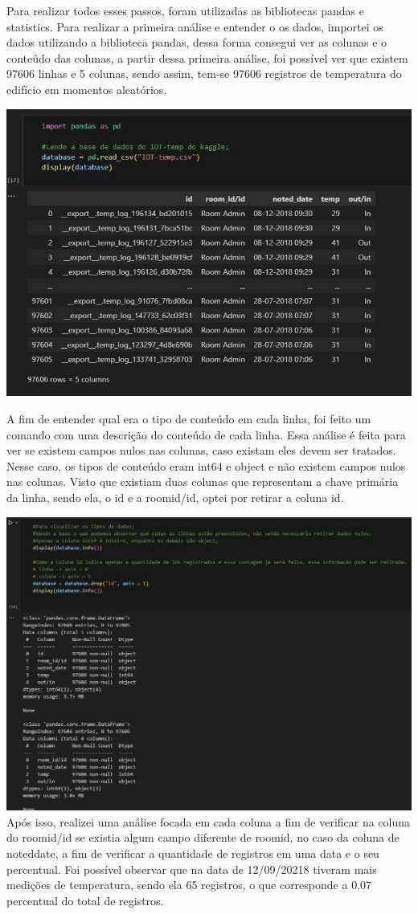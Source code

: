 \documentclass[a4paper, 12pt]{article}
\begin{document}
Para realizar todos esses passos, foram utilizadas as bibliotecas pandas e statistics. Para realizar a primeira análise e entender o os dados, importei os dados utilizando a biblioteca pandas, dessa forma consegui ver as colunas e o conteúdo das colunas, a partir dessa primeira análise, foi possível ver que existem 97606 linhas e 5 colunas, sendo assim, tem-se 97606 registros de temperatura do edifício em momentos aleatórios.

\includegraphics[scale=0.7]{img 01.jpg}

A fim de entender qual era o tipo de conteúdo em cada linha, foi feito um comando com uma descrição do conteúdo de cada linha. Essa análise é feita para ver se existem campos nulos nas colunas, caso existam eles devem ser tratados. Nesse caso, os tipos de conteúdo eram int64 e object e não existem campos nulos nas colunas. Visto que existiam duas colunas que representam a chave primária da linha, sendo ela, o id e a roomid/id, optei por retirar a coluna id.

\includegraphics[scale=0.5]{img 02.jpg}
Após isso, realizei uma análise focada em cada coluna a fim de verificar na coluna do roomid/id se existia algum campo diferente de roomid, no caso da coluna de noteddate, a fim de verificar a quantidade de registros em uma data e o seu percentual. Foi possível observar que na data de 12/09/20218 tiveram mais medições de temperatura, sendo ela 65 registros, o que corresponde a 0.07 percentual do total de registros.
\end{document}
